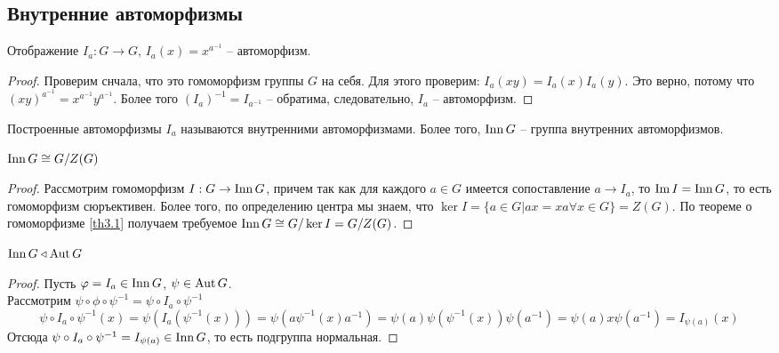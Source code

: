 \subsection{Внутренние автоморфизмы}
\begin{proposition}
    Отображение $I_a: G \to G$, $I_a(x) = x^{a^{-1}}$ -- автоморфизм.
\end{proposition}

\begin{proof}
    Проверим снчала, что это гомоморфизм группы $G$ на себя. Для этого проверим: $I_a(xy) = I_a(x) I_a(y)$. Это верно, потому что $(xy)^{a^{-1}} = x^{a^{-1}} y^{a^{-1}}$. Более того $(I_a)^{-1} = I_{a^{-1}}$ -- обратима, следовательно, $I_a$ -- автоморфизм.
\end{proof}

\begin{definition}
    Построенные автоморфизмы $I_a$ называются внутренними автоморфизмами. Более того, $\operatorname{Inn} G$ -- группа внутренних автоморфизмов.
\end{definition}

\begin{proposition}
    $\operatorname{Inn} G \cong G/Z(G)$
\end{proposition}

\begin{proof}
    Рассмотрим гомоморфизм $I: G \to \operatorname{Inn} G$, причем так как для каждого $a \in G$ имеется сопоставление $a \to I_a$, то $\operatorname{Im} I = \operatorname{Inn} G$, то есть гомоморфизм сюръективен. Более того, по определению центра мы знаем, что $\ker I = \{ a \in G | ax = xa \forall x \in G \} = Z(G)$. По теореме о гомоморфизме \ref{th3.1} получаем требуемое $\operatorname{Inn} G \cong G/\ker I = G/Z(G)$.
\end{proof}

\begin{proposition}
    $\operatorname{Inn} G \triangleleft \operatorname{Aut} G$
\end{proposition}

\begin{proof}
    Пусть $\varphi = I_a \in \operatorname{Inn} G$, $\psi \in \operatorname{Aut} G$. \\
    Рассмотрим $\psi \circ \phi \circ \psi^{-1} = \psi \circ I_a \circ \psi^{-1}$
    $$\psi \circ I_a \circ \psi^{-1}(x) = \psi(I_a(\psi^{-1}(x))) = \psi(a \psi^{-1}(x) a^{-1}) = \psi(a) \psi(\psi^{-1}(x))\psi(a^{-1}) = \psi(a) x \psi(a^{-1}) = I_{\psi(a)}(x)$$
    Отсюда $\psi \circ I_a \circ \psi^{-1} = I_{\psi(a)} \in \operatorname{Inn} G$, то есть подгруппа нормальная.
\end{proof}

